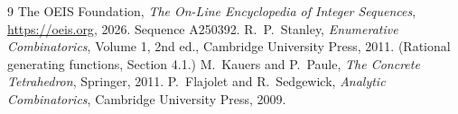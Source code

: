\documentclass[11pt,a4paper]{article}
\theoremstyle{plain}
\theoremstyle{definition}
\begin{document}
\begin{thebibliography}{9}
 The OEIS Foundation, \emph{The On-Line Encyclopedia of Integer
Sequences}, \url{https://oeis.org}, 2026. Sequence A250392.
 R.~P.~Stanley, \emph{Enumerative Combinatorics}, Volume 1, 2nd ed.,
Cambridge University Press, 2011. (Rational generating functions, Section 4.1.)
 M.~Kauers and P.~Paule, \emph{The Concrete Tetrahedron}, Springer, 2011.
 P.~Flajolet and R.~Sedgewick, \emph{Analytic Combinatorics}, Cambridge
University Press, 2009.
\end{thebibliography}
\end{document}
